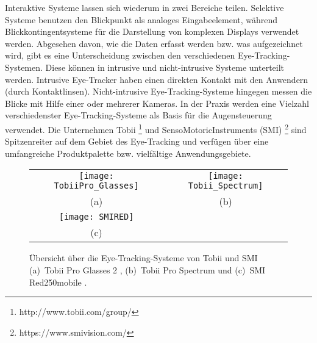 \newline \newline
Interaktive Systeme lassen sich wiederum in zwei Bereiche teilen. Selektive Systeme benutzen den Blickpunkt als analoges Eingabeelement, während \mbox{Blickkontingentsysteme} für die Darstellung von komplexen Displays verwendet werden. 
\newline \newline
Abgesehen davon, wie die Daten erfasst werden bzw. was aufgezeichnet wird, gibt es eine Unterscheidung zwischen den verschiedenen Eye-Tracking-Systemen. \mbox{Diese} können in intrusive und nicht-intrusive Systeme unterteilt werden. Intrusive Eye-Tracker haben einen direkten Kontakt mit den Anwendern (\zB durch Kontaktlinsen). Nicht-intrusive Eye-Tracking-Systeme hingegen messen die Blicke mit Hilfe einer oder \mbox{mehrerer} Kameras. 
\newline \newline
In der Praxis werden eine Vielzahl verschiedenster Eye-Tracking-Systeme als Basis für die Augensteuerung verwendet. Die Unternehmen Tobii%
\footnote{http://www.tobii.com/group/}
%
und SensoMotoricInstruments (SMI)%
\footnote{https://www.smivision.com/}
%
sind Spitzenreiter auf dem Gebiet des Eye-Tracking und verfügen über eine umfangreiche Produktpalette bzw. vielfältige Anwendungsgebiete. 
\begin{figure}
\centering\small
\setlength{\tabcolsep}{0mm}	%
\begin{tabular}{c@{\hspace{-15mm}}c} %
  \texttt{[image: TobiiPro\_Glasses]} &
  \texttt{[image: Tobii\_Spectrum]}
\\
  (a) & (b)
\\[4pt]	%
  \texttt{[image: SMIRED]}
\\
  (c)
\end{tabular}
%
\caption{Übersicht über die Eye-Tracking-Systeme von Tobii und SMI \newline
(a)~Tobii Pro Glasses 2 \cite{TobiiGlasses}, (b)~Tobii Pro Spectrum \cite{TobiiSpectrum} und (c)~SMI Red250mobile \cite{SMIRED}.}
\label{fig:Tobii}
\end{figure}
\newline \newline
